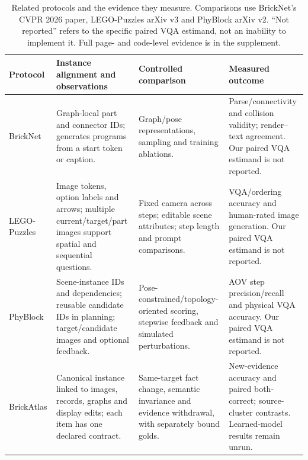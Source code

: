 \begin{table}[t]
\centering\small
\caption{Related protocols and the evidence they measure. Comparisons use
BrickNet's CVPR 2026 paper, LEGO-Puzzles arXiv v3 and PhyBlock arXiv v2.
``Not reported'' refers to the specific paired VQA estimand, not an inability
to implement it. Full page- and code-level evidence is in the supplement.}
\label{tab:related}
\begin{tabularx}{\textwidth}{@{}p{1.75cm}XXX@{}}
\toprule
Protocol & Instance alignment and observations & Controlled comparison &
Measured outcome\\
\midrule
BrickNet~\cite{kulits2026bricknet} &
Graph-local part and connector IDs; generates programs from a start token
or caption. &
Graph/pose representations, sampling and training ablations. &
Parse/connectivity and collision validity; render--text agreement.
Our paired VQA estimand is not reported.\\
LEGO-Puzzles~\cite{tang2025legopuzzles} &
Image tokens, option labels and arrows; multiple current/target/part images
support spatial and sequential questions. &
Fixed camera across steps; editable scene attributes; step length and
prompt comparisons. &
VQA/ordering accuracy and human-rated image generation.
Our paired VQA estimand is not reported.\\
PhyBlock~\cite{ma2025phyblock} &
Scene-instance IDs and dependencies; reusable candidate IDs in planning;
target/candidate images and optional feedback. &
Pose-constrained/topology-oriented scoring, stepwise feedback and
simulated perturbations. &
AOV step precision/recall and physical VQA accuracy.
Our paired VQA estimand is not reported.\\
BrickAtlas &
Canonical instance linked to images, records, graphs and display edits;
each item has one declared contract. &
Same-target fact change, semantic invariance and evidence withdrawal,
with separately bound golds. &
New-evidence accuracy and paired both-correct; source-cluster contrasts.
Learned-model results remain unrun.\\
\bottomrule
\end{tabularx}
\end{table}
